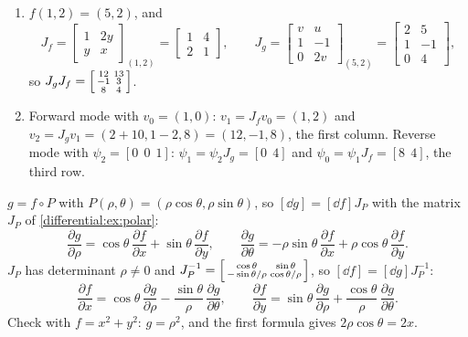 \begin{enumerate}[nosep]
  \item $f(1, 2) = (5, 2)$, and
        \[
          J_f = \begin{bmatrix}1 & 2y\\y & x\end{bmatrix}_{(1, 2)}
          = \begin{bmatrix}1 & 4\\2 & 1\end{bmatrix},
          \qquad
          J_g = \begin{bmatrix}v & u\\1 & -1\\0 & 2v\end{bmatrix}_{(5, 2)}
          = \begin{bmatrix}2 & 5\\1 & -1\\0 & 4\end{bmatrix},
        \]
        so
        $J_gJ_f = \begin{bsmallmatrix}12 & 13\\-1 & 3\\8 & 4
        \end{bsmallmatrix}$.
  \item Forward mode with $v_0 = (1, 0)$: $v_1 = J_fv_0 = (1, 2)$ and
        $v_2 = J_gv_1 = (2 + 10, 1 - 2, 8) = (12, -1, 8)$, the first
        column. Reverse mode with $\psi_2 = [0\ \ 0\ \ 1]$:
        $\psi_1 = \psi_2J_g = [0\ \ 4]$ and
        $\psi_0 = \psi_1J_f = [8\ \ 4]$, the third row.
\end{enumerate}

$g = f\circ P$ with $P(\rho, \theta) = (\rho\cos\theta, \rho\sin\theta)$,
so $[\dd g] = [\dd f]J_P$ with the matrix $J_P$ of
\cref{differential:ex:polar}:
\[
  \frac{\partial g}{\partial\rho}
  = \cos\theta\,\frac{\partial f}{\partial x}
  + \sin\theta\,\frac{\partial f}{\partial y},
  \qquad
  \frac{\partial g}{\partial\theta}
  = -\rho\sin\theta\,\frac{\partial f}{\partial x}
  + \rho\cos\theta\,\frac{\partial f}{\partial y} .
\]
$J_P$ has determinant $\rho\neq0$ and
$J_P^{-1} = \begin{bsmallmatrix}\cos\theta & \sin\theta\\
-\sin\theta/\rho & \cos\theta/\rho\end{bsmallmatrix}$, so
$[\dd f] = [\dd g]J_P^{-1}$:
\[
  \frac{\partial f}{\partial x}
  = \cos\theta\,\frac{\partial g}{\partial\rho}
  - \frac{\sin\theta}\rho\,\frac{\partial g}{\partial\theta},
  \qquad
  \frac{\partial f}{\partial y}
  = \sin\theta\,\frac{\partial g}{\partial\rho}
  + \frac{\cos\theta}\rho\,\frac{\partial g}{\partial\theta} .
\]
Check with $f = x^2 + y^2$: $g = \rho^2$, and the first formula gives
$2\rho\cos\theta = 2x$.

